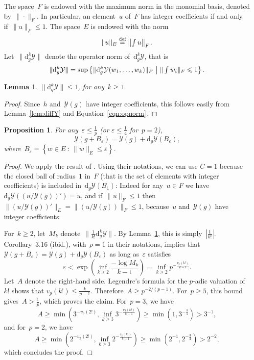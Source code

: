 \documentclass{sig-alternate}
\newtheorem{lem}[theo]{Lemma}
\newtheorem{prop}[theo]{Proposition}
\theoremstyle{definition}
\theoremstyle{remark}
\newcommand\cY{\mathcal{Y}}
\newcommand{\ud}{\mathrm{d}}
\newcommand\padic{$p$-adic\xspace}
\def\eqdef{\stackrel{\text{def}}{=}}
\def\leq{\leqslant}
\def\geq{\geqslant}
\def\st{\ \middle|\ }
\def\smallint{\begingroup\textstyle \int\endgroup}
\begin{document}
The space~$F$ is endowed with the maximum norm in the
monomial basis, denoted by~$\|\cdot\|_F$. In particular, an element~$u$ of~$F$
has integer coefficients if and only if~$\|u\|_F \leq 1$.
The space~$E$ is endowed with the norm
\[ \|u\|_E \eqdef \left\| \smallint u \right \|_F. \]
Let~$\| \ud^k_g \cY \|$ denote the operator norm of~$\ud_g^k \cY$, that is
\begin{equation}
 \| \ud^k_g \cY \| = \sup\left\{ \| \ud_g^k\cY(w_1,\dotsc,w_k) \|_F \st  \|\smallint w_i\|_F \leq 1 \right\}.  
  \label{eqn:opnorm}
\end{equation}

\begin{lem}
  \label{lem:normDY}
  $\| \ud^k_g \cY \| \leq 1$, for any~$k\geq 1$.
\end{lem}

\begin{proof}
  Since~$h$ and~$\cY(g)$ have integer coefficients, this follows easily from Lemma~\ref{lem:diffY}
  and Equation~\eqref{eqn:opnorm}.
\end{proof}

\begin{prop}\label{prop:CRV}
  For any~$\varepsilon \leq \frac1p$ (or $\varepsilon \leq \frac14$ for~$p=2$),
  \[ \cY(g + B_\varepsilon) = \cY(g) + \ud_g\cY(B_\varepsilon), \]
  where~$B_\varepsilon = \left\{ w\in E \ :\  \|w\|_E \leq \varepsilon \right\}$.
\end{prop}

\begin{proof}
  We apply the result of \textcite[Corollary~3.16]{CarRoeVac14}.  Using their
  notations, we can use $C=1$ because the closed ball of radius~$1$ in~$F$
  (that is the set of elements with integer coefficients) is included
  in~$\ud_g\cY(B_1)$: Indeed for any~$u\in F$ we have~$\ud_g \cY\left( ( u / \cY(g) )' \right) = u$,
  and if~$\|u\|_F \leq 1$ then
  $ \| ( u / \cY(g) )' \|_E = \| ( u / \cY(g) ) \|_F \leq 1$,
  because~$u$ and~$\cY(g)$ have integer coefficients.

  For~$k\geq 2$, let~$M_k$ denote~$\| \frac{1}{k!} \ud^k_g \cY \|$.
  By Lemma~\ref{lem:normDY}, this is simply~$| \frac{1}{k!}|$.
  Corollary~3.16 (ibid.),  with~$\rho=1$ in their notations,  implies that
  $\cY(g + B_\varepsilon) = \cY(g) + \ud_g\cY(B_\varepsilon)$ as long as~$\varepsilon$ satisfies
  \[ \varepsilon < \exp\left(\inf_{k\geq 2} \frac{-\log M_k}{k-1}  \right) = \inf_{k\geq 2} p^{-\frac{v_p(k!)}{k-1}}. \]
  Let~$A$ denote the right-hand side. Legendre's formula for the \padic valuation of~$k!$ shows that
  $v_p(k!) \leq \frac{k}{p-1}$. Therefore~$A \geq p^{-2/(p-1)}$.
  For~$p\geq 5$, this bound gives~$A > \frac{1}{p}$, which proves the claim.
  For~$p = 3$, we have
  \[ A \geq \min\left( 3^{-v_3(2!)}, \inf_{k\geq 3} 3^{-\frac{v_3(k!)}{k-1}} \right) \geq \min\left(1, 3^{-\frac34}\right) > 3^{-1}, \]
  and for~$p=2$, we have
  \[ A \geq \min\left( 2^{-v_2(2!)}, \inf_{k\geq 3} 2^{-\frac{v_2(k!)}{k-1}} \right) \geq \min\left(2^{-1}, 2^{-\frac32}\right) > 2^{-2}, \]
  which concludes the proof.
\end{proof}
\end{document}
